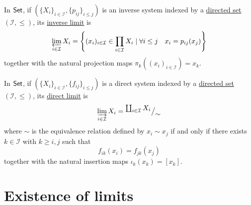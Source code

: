 \documentclass[../../main]{subfiles}
\begin{document}
\begin{example}
  In \(\mathsf{Set}\), if \((\{X_{i}\}_{i \in \mathcal{I}}, \{p_{ij}\}_{i \leq j})\) is an inverse system indexed by a \hyperref[def:directed-set]{directed set} \((\mathcal{I}, \leq)\), its \hyperref[def:inverse-limit]{inverse limit} is
  \begin{equation*}
    \varprojlim_{i \in \mathcal{I}} X_{i} = \left\{ (x_{i})_{i \in \mathcal{I}} \in \prod_{i \in \mathcal{I}} X_{i} \mid \forall i \leq j \quad x_{i} = p_{ij}(x_{j}) \right\}
  \end{equation*}
  together with the natural projection maps \(\pi_k((x_i)_{i \in \mathcal{I}}) = x_k\).
\end{example}

\begin{example}\label{ex:direct-limits-set}
  In \(\mathsf{Set}\), if \((\{X_{i}\}_{i \in \mathcal{I}}, \{f_{ij}\}_{i \leq j})\) is a direct system indexed by a \hyperref[def:directed-set]{directed set} \((\mathcal{I}, \leq)\), its \hyperref[def:direct-limit]{direct limit} is
  \begin{equation*}
    \varinjlim_{i \in \mathcal{I}} X_{i} = {^{\textstyle \coprod_{i \in \mathcal{I}} X_{i}}\big/_{\textstyle \sim}}
  \end{equation*}
  where \(\sim\) is the equivalence relation defined by \(x_{i} \sim x_{j}\) if and only if there exists \(k \in \mathcal{I}\) with \(k \geq i, j\) such that
  \begin{equation*}
    f_{ik}(x_{i}) = f_{jk}(x_{j})
  \end{equation*}
  together with the natural insertion maps \(\iota_k(x_k) = [x_k]\).
\end{example}

\section{Existence of limits}
\end{document}

